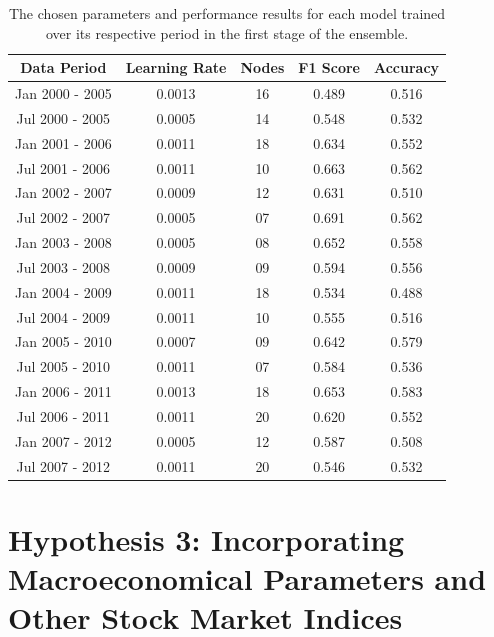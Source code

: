 \documentclass{UoYCSproject}
\begin{document}
\begin{table}[h]
    \centering
    \begin{tabular}{|c|c|c|c|c|} \hline
        \textbf{Data Period} & \textbf{Learning Rate} & \textbf{Nodes} & \textbf{F1 Score} & \textbf{Accuracy} \\ \hline
        Jan 2000 - 2005 & 0.0013 & 16 & 0.489 & 0.516 \\
        Jul 2000 - 2005 & 0.0005 & 14 & 0.548 & 0.532 \\
        Jan 2001 - 2006 & 0.0011 & 18 & 0.634 & 0.552 \\
        Jul 2001 - 2006 & 0.0011 & 10 & 0.663 & 0.562 \\
        Jan 2002 - 2007 & 0.0009 & 12 & 0.631 & 0.510 \\
        Jul 2002 - 2007 & 0.0005 & 07 & 0.691 & 0.562 \\
        Jan 2003 - 2008 & 0.0005 & 08 & 0.652 & 0.558 \\
        Jul 2003 - 2008 & 0.0009 & 09 & 0.594 & 0.556 \\
        Jan 2004 - 2009 & 0.0011 & 18 & 0.534 & 0.488 \\
        Jul 2004 - 2009 & 0.0011 & 10 & 0.555 & 0.516 \\
        Jan 2005 - 2010 & 0.0007 & 09 & 0.642 & 0.579 \\
        Jul 2005 - 2010 & 0.0011 & 07 & 0.584 & 0.536 \\
        Jan 2006 - 2011 & 0.0013 & 18 & 0.653 & 0.583 \\
        Jul 2006 - 2011 & 0.0011 & 20 & 0.620 & 0.552 \\
        Jan 2007 - 2012 & 0.0005 & 12 & 0.587 & 0.508 \\
        Jul 2007 - 2012 & 0.0011 & 20 & 0.546 & 0.532 \\
        \hline
    \end{tabular}
    \caption{The chosen parameters and performance results for each model trained over its respective period in the first stage of the ensemble.}
    \label{tab:test_stage1}
\end{table}





\section{Hypothesis 3: Incorporating Macroeconomical Parameters and Other Stock Market Indices}
\end{document}
